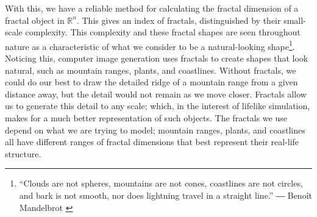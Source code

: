 With this, we have a reliable method for calculating the fractal dimension of a fractal object in $\mathbb{R}^n$. This gives an index of fractals, distinguished by their small-scale complexity. 
This complexity and these fractal shapes are seen throughout nature as a characteristic of what we consider to be a natural-looking shape\footnote{“Clouds are not spheres, mountains are not cones, coastlines are not circles, and bark is not smooth, nor does lightning travel in a straight line.”
― Benoît Mandelbrot \cite{mandelbrot1983fractal}}.
Noticing this, computer image generation uses fractals to create shapes that look natural, such as mountain ranges, plants, and coastlines. Without fractals, we could do our best to draw the detailed ridge of a mountain range from a given distance away, but the detail would not remain as we move closer. Fractals allow us to generate this detail to any scale; which, in the interest of lifelike simulation, makes for a much better representation of such objects. The fractals we use depend on what we are trying to model; mountain ranges, plants, and coastlines all have different ranges of fractal dimensions that best represent their real-life structure. 


